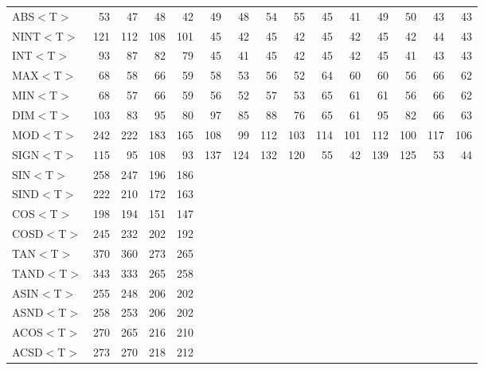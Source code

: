 \documentclass[11pt,nolof]{starlink}
\begin{document}
\begin{table}[h]
\begin{center}
\begin{scriptsize}
\begin{tabular}{|l|r|r||r|r||r|r||r|r||r|r||r|r||r|r|}
ABS$<$T$>$ &   53 &   47 &   48 &   42 &   49 &   48 &   54 &   55 &   45 &   41 &   49 &   50 &   43 &   43 \\
NINT$<$T$>$ &  121 &  112 &  108 &  101 &   45 &   42 &   45 &   42 &   45 &   42 &   45 &   42 &   44 &   43 \\
INT$<$T$>$ &   93 &   87 &   82 &   79 &   45 &   41 &   45 &   42 &   45 &   42 &   45 &   41 &   43 &   43 \\
MAX$<$T$>$ &   68 &   58 &   66 &   59 &   58 &   53 &   56 &   52 &   64 &   60 &   60 &   56 &   66 &   62 \\
MIN$<$T$>$ &   68 &   57 &   66 &   59 &   56 &   52 &   57 &   53 &   65 &   61 &   61 &   56 &   66 &   62 \\
DIM$<$T$>$ &  103 &   83 &   95 &   80 &   97 &   85 &   88 &   76 &   65 &   61 &   95 &   82 &   66 &   63 \\
MOD$<$T$>$ &  242 &  222 &  183 &  165 &  108 &   99 &  112 &  103 &  114 &  101 &  112 &  100 &  117 &  106 \\
SIGN$<$T$>$ &  115 &   95 &  108 &   93 &  137 &  124 &  132 &  120 &   55 &   42 &  139 &  125 &   53 &   44 \\
SIN$<$T$>$ &  258 &  247 &  196 &  186 &      &      &      &      &      &      &      &      &      &      \\
SIND$<$T$>$ &  222 &  210 &  172 &  163 &      &      &      &      &      &      &      &      &      &      \\
COS$<$T$>$ &  198 &  194 &  151 &  147 &      &      &      &      &      &      &      &      &      &      \\
COSD$<$T$>$ &  245 &  232 &  202 &  192 &      &      &      &      &      &      &      &      &      &      \\
TAN$<$T$>$ &  370 &  360 &  273 &  265 &      &      &      &      &      &      &      &      &      &      \\
TAND$<$T$>$ &  343 &  333 &  265 &  258 &      &      &      &      &      &      &      &      &      &      \\
ASIN$<$T$>$ &  255 &  248 &  206 &  202 &      &      &      &      &      &      &      &      &      &      \\
ASND$<$T$>$ &  258 &  253 &  206 &  202 &      &      &      &      &      &      &      &      &      &      \\
ACOS$<$T$>$ &  270 &  265 &  216 &  210 &      &      &      &      &      &      &      &      &      &      \\
ACSD$<$T$>$ &  273 &  270 &  218 &  212 &      &      &      &      &      &      &      &      &      &      \\

\end{tabular}
\end{scriptsize}
\end{center}
\end{table}
\end{document}
